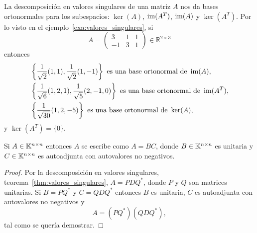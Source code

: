 \begin{example}
	La descomposición en valores singulares de una matriz $A$ nos da bases
	ortonormales para los subespacios: $\ker(A)$, $\operatorname{im}(A^{T})$, $\operatorname{im}(A)$ y
	$\ker(A^{T})$.  Por lo visto en el ejemplo~\ref{exa:valores_singulares}, si
	\[
	A=\left(\begin{array}{ccc}
		3 & 1 & 1\\
		-1 & 3 & 1
	\end{array}\right)\in\mathbb{R}^{2\times3}
	\]
	entonces 
	\begin{align*}
		&\left\{ \frac{1}{\sqrt{2}}(1,1),\frac{1}{\sqrt{2}}(1,-1)\right\} \text{ es una base ortonormal de }\operatorname{im} (A),\\
		&\left\{ \frac{1}{\sqrt{6}}(1,2,1),\frac{1}{\sqrt{5}}(2,-1,0)\right\} \text{ es una base ortonormal de }\operatorname{im} (A^{T}),\\
		&\left\{ \frac{1}{\sqrt{30}}(1,2,-5)\right\} \text{ es una base ortonormal de }\ker (A),
	\end{align*}
	y $\ker (A^{T})=\{0\}$. 
\end{example}

\begin{cor}
	Si $A\in\mathbb{K}^{n\times n}$ entonces $A$ se escribe como $A=BC$, donde
	$B\in\mathbb{K}^{n\times n}$ es unitaria y $C\in\mathbb{K}^{n\times n}$ es autoadjunta con
	autovalores no negativos. 

	\begin{proof}
		Por la descomposición en valores singulares,
		teorema~\ref{thm:valores_singulares}, $A=PDQ^*$, donde $P$ y $Q$ son
		matrices unitarias. Si $B=PQ^*$ y $C=QDQ^*$ entonces $B$ es
		unitaria, $C$ es autoadjunta con autovalores no negativos y 
		\[
			A=(PQ^*)(QDQ^*),
		\]
		tal como se quería demostrar.
%
	\end{proof}
\end{cor}

